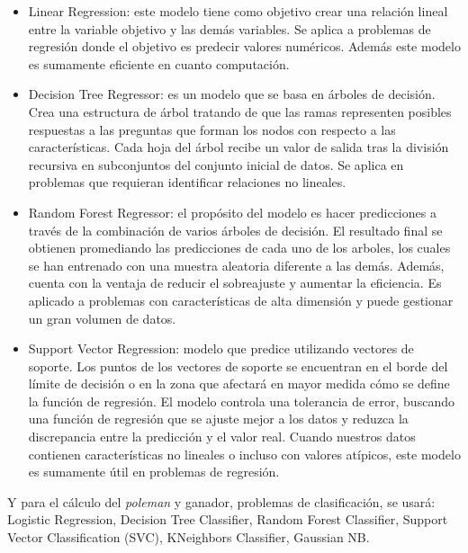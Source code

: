 \begin{itemize}
    \item Linear Regression: este modelo tiene como objetivo crear una relación lineal entre la variable objetivo y las demás variables. Se aplica a problemas de regresión donde el objetivo es predecir valores numéricos. Además este modelo es sumamente eficiente en cuanto computación.
    \item Decision Tree Regressor: es un modelo que se basa en árboles de decisión. Crea una estructura de árbol tratando de que las ramas representen posibles respuestas a las preguntas que forman los nodos con respecto a las características. Cada hoja del árbol recibe un valor de salida tras la división recursiva en subconjuntos del conjunto inicial de datos. Se aplica en problemas que requieran identificar relaciones no lineales.
    \item Random Forest Regressor: el propósito del modelo es hacer predicciones a través de la combinación de varios árboles de decisión. El resultado final se obtienen promediando las predicciones de cada uno de los arboles, los cuales se han entrenado con una muestra aleatoria diferente a las demás. Además, cuenta con la ventaja de reducir el sobreajuste y aumentar la eficiencia. Es aplicado a problemas con características de alta dimensión y puede gestionar un gran volumen de datos.
    \item Support Vector Regression: modelo que predice utilizando vectores de soporte. Los puntos de los vectores de soporte se encuentran en el borde del límite de decisión o en la zona que afectará en mayor medida cómo se define la función de regresión. El modelo controla una tolerancia de error, buscando una función de regresión que se ajuste mejor a los datos y reduzca la discrepancia entre la predicción y el valor real. Cuando nuestros datos contienen características no lineales o incluso con valores atípicos, este modelo es sumamente útil en problemas de regresión.
\end{itemize}

Y para el cálculo del \textit{poleman} y ganador, problemas de clasificación, se usará: Logistic Regression, Decision Tree Classifier, Random Forest Classifier, Support Vector Classification (SVC), KNeighbors Classifier, Gaussian NB.

